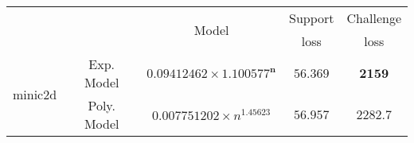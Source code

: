 \begin{tabular}{ccccc} 
\hline 
 &  & \multirow{2}{*}{Model} & Support & Challenge\tabularnewline 
 &  &  & loss  & loss\tabularnewline 
\hline 
\hline 
\multirow{2}{*}{minic2d} & Exp. Model & $\mathbf{0.09412462\times 1.100577^{n}}$ & $\mathbf{56.369}$ & $\mathbf{2159}$ \tabularnewline 
 & Poly. Model & $0.007751202\times n^{1.45623}$ & $56.957$ & $2282.7$ \tabularnewline 
\hline 
\end{tabular} 

